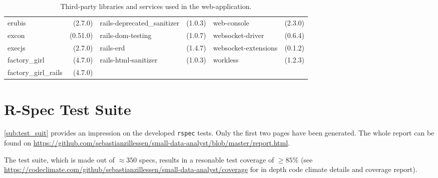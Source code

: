 \begin{table}[!h]
\begin{tabular}{|p{2.4cm}r||p{2.4cm}r||p{2.4cm}r|}
erubis&(2.7.0)&\tiny{rails-deprecated\_sanitizer}&(1.0.3)&web-console&(2.3.0)\\
excon&(0.51.0)&\tiny{rails-dom-testing}&(1.0.7)&\tiny{websocket-driver}&(0.6.4)\\
execjs&(2.7.0)&rails-erd&(1.4.7)&\tiny{websocket-extensions}&(0.1.2)\\
factory\_girl&(4.7.0)&\tiny{rails-html-sanitizer}&(1.0.3)&workless&(1.2.3)\\
factory\_girl\_rails&(4.7.0)&&&&\\
	\hline
	\end{tabular}
	\caption{Third-party libraries and services used in the web-application.}
	\label{tab:libs}
\end{table}

\clearpage
\newpage

\section{R-Spec Test Suite}
\label{app:d}
\label{app:rspec}
\sloppy
\autoref{sub:test_suit} provides an impression on the developed \texttt{rspec} tests. Only the first two pages have been generated. The whole report can be found on \url{https://github.com/sebastianzillessen/small-data-analyst/blob/master/report.html}. 

The test suite, which is made out of $\approx 350$ specs, results in a resonable test coverage of $\geq 85\%$ (see \url{https://codeclimate.com/github/sebastianzillessen/small-data-analyst/coverage} for in depth code climate details and coverage report).


